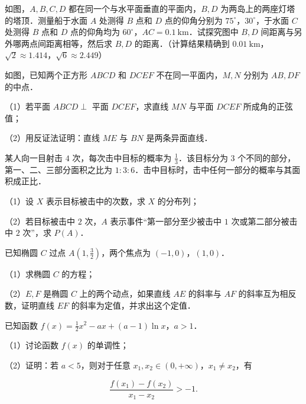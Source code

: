 \Needspace{0.4\textheight}
\begin{question}
如图，$A,B,C,D$ 都在同一个与水平面垂直的平面内，$B,D$ 为两岛上的两座灯塔的塔顶．测量船于水面 $A$ 处测得 $B$ 点和 $D$ 点的仰角分别为 $75^\circ$，$30^\circ$，于水面 $C$ 处测得 $B$ 点和 $D$ 点的仰角均为 $60^\circ$，$AC=0.1\ \mathrm{km}$．试探究图中 $B,D$ 间距离与另外哪两点间距离相等，然后求 $B,D$ 的距离．（计算结果精确到 $0.01\ \mathrm{km}$，$\sqrt2\approx1.414$，$\sqrt6\approx2.449$）
\nopagebreak[4]
\begin{center}\end{center}
\nopagebreak[4]
\Needspace{0.4\textheight}
\end{question}
\begin{question}
如图，已知两个正方形 $ABCD$ 和 $DCEF$ 不在同一平面内，$M,N$ 分别为 $AB,DF$ 的中点．

（1）若平面 $ABCD\perp$ 平面 $DCEF$，求直线 $MN$ 与平面 $DCEF$ 所成角的正弦值；

（2）用反证法证明：直线 $ME$ 与 $BN$ 是两条异面直线．
\nopagebreak[4]
\begin{center}\end{center}
\nopagebreak[4]
\end{question}
\begin{question}
某人向一目射击 $4$ 次，每次击中目标的概率为 $\frac13$．该目标分为 $3$ 个不同的部分，第一、二、三部分面积之比为 $1:3:6$．击中目标时，击中任何一部分的概率与其面积成正比．

（1）设 $X$ 表示目标被击中的次数，求 $X$ 的分布列；

（2）若目标被击中 $2$ 次，$A$ 表示事件“第一部分至少被击中 $1$ 次或第二部分被击中 $2$ 次”，求 $P(A)$．

\end{question}
\begin{question}
已知椭圆 $C$ 过点 $A\left(1,\frac32\right)$，两个焦点为 $(-1,0)$，$(1,0)$．

（1）求椭圆 $C$ 的方程；

（2）$E,F$ 是椭圆 $C$ 上的两个动点，如果直线 $AE$ 的斜率与 $AF$ 的斜率互为相反数，证明直线 $EF$ 的斜率为定值，并求出这个定值．

\end{question}
\begin{question}
已知函数 $f(x)=\frac12x^2-ax+(a-1)\ln x$，$a>1$．

（1）讨论函数 $f(x)$ 的单调性；

（2）证明：若 $a<5$，则对于任意 $x_1,x_2\in(0,+\infty)$，$x_1\neq x_2$，有

\nopagebreak[4]
\[\frac{f(x_1)-f(x_2)}{x_1-x_2}>-1 .\]

\Needspace{0.4\textheight}
\end{question}
